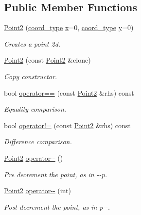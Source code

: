\subsection*{Public Member Functions}
\begin{DoxyCompactItemize}
\item 
\mbox{\hyperlink{structlife_1_1_point2_a7b7c76f2f3c4bd223d451fd4721eb6a5}{Point2}} (\mbox{\hyperlink{structlife_1_1_point2_abc66c92a3ad99b7fb9d8c179213edf58}{coord\+\_\+type}} \mbox{\hyperlink{structlife_1_1_point2_af341f4da818e4699e52bb6e9bff041dd}{x}}=0, \mbox{\hyperlink{structlife_1_1_point2_abc66c92a3ad99b7fb9d8c179213edf58}{coord\+\_\+type}} \mbox{\hyperlink{structlife_1_1_point2_aeb68123ffdb09000bb989dd38bb37af7}{y}}=0)
\begin{DoxyCompactList}\small\item\em Creates a point 2d. \end{DoxyCompactList}\item 
\mbox{\hyperlink{structlife_1_1_point2_ab00bbd691da15470725326c377f3e202}{Point2}} (const \mbox{\hyperlink{structlife_1_1_point2}{Point2}} \&clone)
\begin{DoxyCompactList}\small\item\em Copy constructor. \end{DoxyCompactList}\item 
bool \mbox{\hyperlink{structlife_1_1_point2_a49365f204542c7716a842f6110fb012b}{operator==}} (const \mbox{\hyperlink{structlife_1_1_point2}{Point2}} \&rhs) const
\begin{DoxyCompactList}\small\item\em Equality comparison. \end{DoxyCompactList}\item 
bool \mbox{\hyperlink{structlife_1_1_point2_a39b4687ad40acf7e01e906f8d0474edb}{operator!=}} (const \mbox{\hyperlink{structlife_1_1_point2}{Point2}} \&rhs) const
\begin{DoxyCompactList}\small\item\em Difference comparison. \end{DoxyCompactList}\item 
\mbox{\hyperlink{structlife_1_1_point2}{Point2}} \mbox{\hyperlink{structlife_1_1_point2_a9536e66da2ec9dc3784596291069b852}{operator-\/-\/}} ()
\begin{DoxyCompactList}\small\item\em Pre decrement the point, as in {\ttfamily -\/-\/p}. \end{DoxyCompactList}\item 
\mbox{\hyperlink{structlife_1_1_point2}{Point2}} \mbox{\hyperlink{structlife_1_1_point2_ac7a2f2f21dd979316824a8a34b5c08d7}{operator-\/-\/}} (int)
\begin{DoxyCompactList}\small\item\em Post decrement the point, as in {\ttfamily p-\/-\/}. \end{DoxyCompactList}\end{DoxyCompactItemize}
